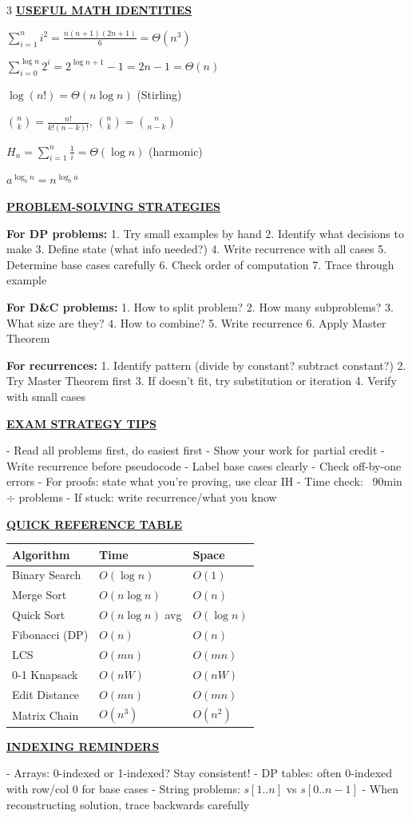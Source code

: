 \documentclass[7pt,landscape]{article}
\newcommand{\sect}[1]{\vspace{1mm}\textbf{\underline{#1}}\vspace{0.5mm}}
\begin{document}
\begin{multicols}{3}
\sect{USEFUL MATH IDENTITIES}

$\sum_{i=1}^n i^2 = \frac{n(n+1)(2n+1)}{6} = \Theta(n^3)$

$\sum_{i=0}^{\log n} 2^i = 2^{\log n + 1} - 1 = 2n - 1 = \Theta(n)$

$\log(n!) = \Theta(n\log n)$ (Stirling)

$\binom{n}{k} = \frac{n!}{k!(n-k)!}$, $\binom{n}{k} = \binom{n}{n-k}$

$H_n = \sum_{i=1}^n \frac{1}{i} = \Theta(\log n)$ (harmonic)

$a^{\log_b n} = n^{\log_b a}$

\sect{PROBLEM-SOLVING STRATEGIES}

\textbf{For DP problems:}
1. Try small examples by hand
2. Identify what decisions to make
3. Define state (what info needed?)
4. Write recurrence with all cases
5. Determine base cases carefully
6. Check order of computation
7. Trace through example

\textbf{For D\&C problems:}
1. How to split problem?
2. How many subproblems?
3. What size are they?
4. How to combine?
5. Write recurrence
6. Apply Master Theorem

\textbf{For recurrences:}
1. Identify pattern (divide by constant? subtract constant?)
2. Try Master Theorem first
3. If doesn't fit, try substitution or iteration
4. Verify with small cases

\sect{EXAM STRATEGY TIPS}

- Read all problems first, do easiest first
- Show your work for partial credit
- Write recurrence before pseudocode
- Label base cases clearly
- Check off-by-one errors
- For proofs: state what you're proving, use clear IH
- Time check: ~90min $\div$ problems
- If stuck: write recurrence/what you know

\sect{QUICK REFERENCE TABLE}

\begin{tabular}{|l|l|l|}
\hline
\textbf{Algorithm} & \textbf{Time} & \textbf{Space} \\
\hline
Binary Search & $O(\log n)$ & $O(1)$ \\
Merge Sort & $O(n\log n)$ & $O(n)$ \\
Quick Sort & $O(n\log n)$ avg & $O(\log n)$ \\
Fibonacci (DP) & $O(n)$ & $O(n)$ \\
LCS & $O(mn)$ & $O(mn)$ \\
0-1 Knapsack & $O(nW)$ & $O(nW)$ \\
Edit Distance & $O(mn)$ & $O(mn)$ \\
Matrix Chain & $O(n^3)$ & $O(n^2)$ \\
\hline
\end{tabular}

\sect{INDEXING REMINDERS}

- Arrays: 0-indexed or 1-indexed? Stay consistent!
- DP tables: often 0-indexed with row/col 0 for base cases
- String problems: $s[1..n]$ vs $s[0..n-1]$
- When reconstructing solution, trace backwards carefully

\end{multicols}
\end{document}
